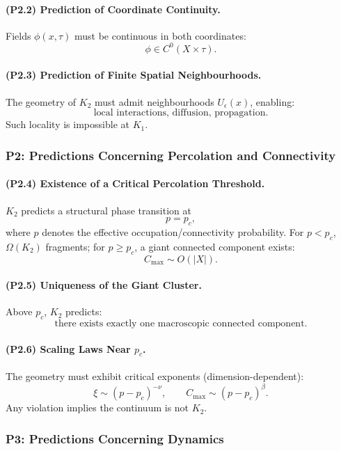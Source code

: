 \paragraph{(P2.2) Prediction of Coordinate Continuity.}
Fields $\phi(x,\tau)$ must be continuous in both coordinates:
\[
\phi \in C^0(X\times\tau).
\]

\paragraph{(P2.3) Prediction of Finite Spatial Neighbourhoods.}
The geometry of $K_2$ must admit neighbourhoods $U_\epsilon(x)$, enabling:
\[
\text{local interactions, diffusion, propagation}.
\]
Such locality is impossible at $K_1$.

\subsubsection{P2: Predictions Concerning Percolation and Connectivity}

\paragraph{(P2.4) Existence of a Critical Percolation Threshold.}
$K_2$ predicts a structural phase transition at
\[
p = p_c,
\]
where $p$ denotes the effective occupation/connectivity probability.
For $p < p_c$, $\Omega(K_2)$ fragments; for $p \ge p_c$, a giant connected
component exists:
\[
C_{\max} \sim O(|X|).
\]

\paragraph{(P2.5) Uniqueness of the Giant Cluster.}
Above $p_c$, $K_2$ predicts:
\[
\text{there exists exactly one macroscopic connected component}.
\]

\paragraph{(P2.6) Scaling Laws Near \texorpdfstring{$p_c$}{p_c}.}
The geometry must exhibit critical exponents (dimension-dependent):
\[
\xi \sim (p-p_c)^{-\nu},
\qquad
C_{\max} \sim (p-p_c)^\beta.
\]
Any violation implies the continuum is not $K_2$.

\subsubsection{P3: Predictions Concerning Dynamics}

